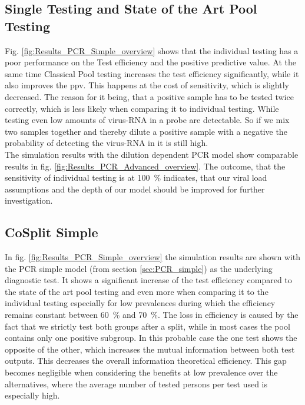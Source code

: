 \documentclass[fleqn,10pt]{wlscirep}
\begin{document}
	\subsection{Single Testing and State of the Art Pool Testing}
	
	Fig. \ref{fig:Results_PCR_Simple_overview} shows that the individual testing has a poor performance on the Test efficiency and the positive predictive value. At the same time Classical Pool testing increases the test efficiency significantly, while it also improves the \gls{ppv}. This happens at the cost of sensitivity, which is slightly decreased. The reason for it being, that a positive sample has to be tested twice correctly, which is less likely when comparing it to individual testing. While testing even low amounts of virus-RNA in a probe are detectable. So if we mix two samples together and thereby dilute a positive sample with a negative the probability of detecting the virus-RNA in it is still high. \\
	
	The simulation results with the dilution dependent PCR model show comparable results in fig. \ref{fig:Results_PCR_Advanced_overview}. The outcome, that the sensitivity of individual testing is at \SI{100}{\percent} indicates, that our viral load assumptions and the depth of our model should be improved for further investigation.
	
	
	
	
	\subsection{CoSplit Simple}
	
	In fig. \ref{fig:Results_PCR_Simple_overview} the simulation results are shown with the PCR simple model (from section \ref{sec:PCR_simple}) as the underlying diagnostic test. It shows a significant increase of the test efficiency compared to the state of the art pool testing and even more when comparing it to the individual testing especially for low prevalences during which the efficiency remains constant between \SI{60}{\percent} and \SI{70}{\percent}. The loss in efficiency is caused by the fact that we strictly test both groups after a split, while in most cases the pool contains only one positive subgroup. In this probable case the one test shows the opposite of the other, which increases the mutual information between both test outputs. This decreases the overall information theoretical efficiency. This gap becomes negligible when considering the benefits at low prevalence over the alternatives, where the average number of tested persons per test used is especially high. \\
	
\end{document}
